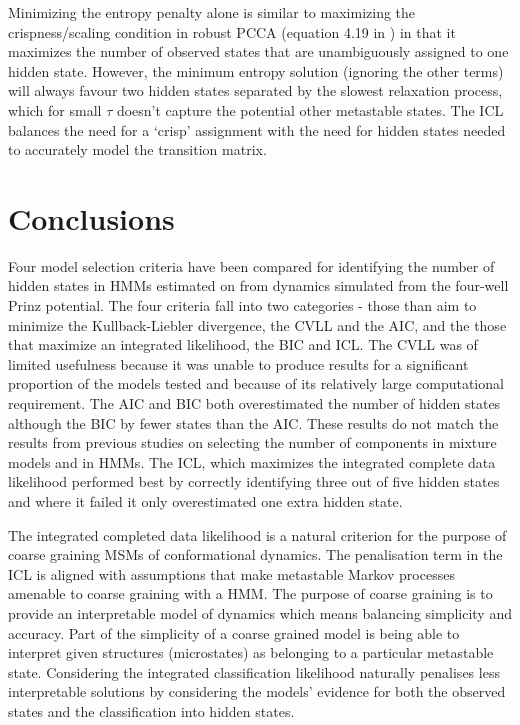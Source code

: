Minimizing the entropy penalty alone is similar to maximizing the crispness/scaling condition  in robust PCCA (equation 4.19 in \cite{deuflhardRobustPerronCluster2005b}) in that it maximizes the number of  observed states that are unambiguously assigned to one hidden state. However, the minimum entropy solution (ignoring the other terms) will always favour two hidden states separated by the slowest relaxation process, which for small $\tau$ doesn't capture the potential other metastable states. The ICL balances the need for a `crisp' assignment with the need for hidden states needed to accurately  model the transition matrix. 
\section{Conclusions}\label{sec:hmm_conclusions}
Four model selection criteria have been compared for identifying the number of hidden states in HMMs estimated on from dynamics simulated from the four-well Prinz potential. The four criteria fall into two categories - those than aim to minimize the Kullback-Liebler divergence, the CVLL and the AIC, and the those that maximize an integrated likelihood, the BIC and ICL. The CVLL was of limited usefulness because it was unable to produce results for a significant proportion of the models tested and because of its relatively large computational requirement. The AIC and BIC both overestimated the number of hidden states although the BIC by fewer states than the AIC. These results do not match the results from previous studies on selecting the number of components in mixture models and in HMMs. The ICL, which maximizes the integrated complete data likelihood performed best by correctly identifying three out of five hidden states and where it failed it only overestimated one extra hidden state. 

The integrated completed data likelihood is a natural criterion for the purpose of coarse graining  MSMs of conformational dynamics. The penalisation term in the ICL is aligned with assumptions that make metastable Markov processes amenable to coarse graining with a HMM. The purpose of coarse graining is to provide an interpretable model of dynamics which means balancing simplicity and accuracy. Part of the simplicity of a coarse grained model is being able to interpret given structures (microstates) as belonging to a particular metastable state. Considering the integrated classification likelihood naturally penalises less interpretable solutions by considering the models' evidence for both the observed states and the classification into hidden states. 

